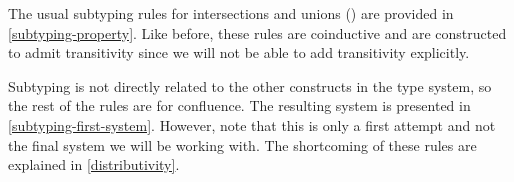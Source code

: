 The usual subtyping rules for intersections and unions (\cite{DunfieldP03}) are provided in \cref{subtyping-property}. Like before, these rules are coinductive and are constructed to admit transitivity since we will not be able to add transitivity explicitly.



Subtyping is not directly related to the other constructs in the type system, so the rest of the rules are for confluence. The resulting system is presented in \cref{subtyping-first-system}. However, note that this is only a first attempt and not the final system we will be working with. The shortcoming of these rules are explained in \cref{distributivity}.



